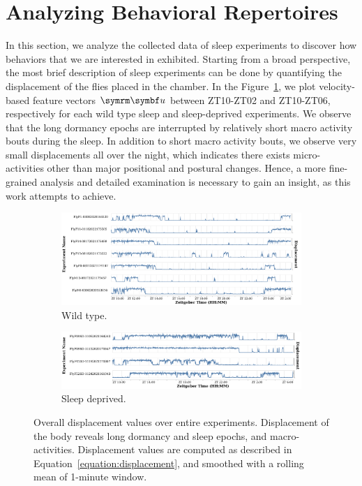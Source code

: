 \section{Analyzing Behavioral Repertoires}\label{section:analyzing-behavioral-repertoires}
In this section, we analyze the collected data of sleep experiments to discover how behaviors that we are interested in exhibited.
Starting from a broad perspective, the most brief description of sleep experiments can be done by quantifying the displacement of the flies placed in the chamber.
In the Figure~\ref{figure:displacement}, we plot velocity-based feature vectors $\V{u}$ between ZT10-ZT02 and ZT10-ZT06, respectively for each wild type sleep and sleep-deprived experiments.
We observe that the long dormancy epochs are interrupted by relatively short macro activity bouts during the sleep.
In addition to short macro activity bouts, we observe very small displacements all over the night, which indicates there exists micro-activities other than major positional and postural changes.
Hence, a more fine-grained analysis and detailed examination is necessary to gain an insight, as this work attempts to achieve.

\begin{figure}[htb!]
	\centering
	\begin{subfigure}[ht!]{0.95\linewidth}
		\centering\includegraphics[width=\linewidth]{figures/Velocity-WT-1T.pdf}
		\caption{Wild type.}
	\end{subfigure}%

	\begin{subfigure}[ht!]{0.95\linewidth}
		\centering\includegraphics[width=\linewidth]{figures/Velocity-SD-1T.pdf}
		\caption{Sleep deprived.}
	\end{subfigure}%
	\caption[Overall displacement values over entire experiments.]{Overall displacement values over entire experiments.
		Displacement of the body reveals long dormancy and sleep epochs, and macro-activities.
		Displacement values are computed as described in Equation~\ref{equation:displacement}, and smoothed with a rolling mean of 1-minute window.\label{figure:displacement}}
\end{figure}

